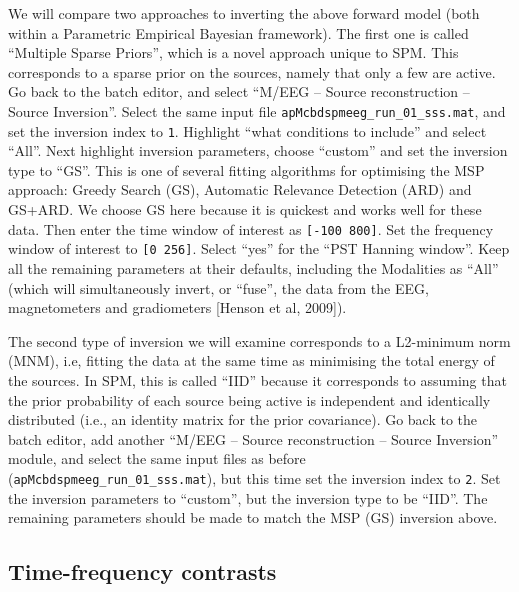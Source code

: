 We will compare two approaches to inverting the above forward model (both within a Parametric Empirical Bayesian framework). The first one is called ``Multiple Sparse Priors'', which is a novel approach unique to SPM. This corresponds to a sparse prior on the sources, namely that only a few are active. Go back to the batch editor, and select ``M/EEG -- Source reconstruction -- Source Inversion''. Select the same input file \texttt{apMcbdspmeeg\_run\_01\_sss.mat}, and set the inversion index to \texttt{1}. Highlight ``what conditions to include'' and select ``All''. Next highlight inversion parameters, choose ``custom'' and set the inversion type to ``GS''. This is one of several fitting algorithms for optimising the MSP approach: Greedy Search (GS), Automatic Relevance Detection (ARD) and GS+ARD. We choose GS here because it is quickest and works well for these data. Then enter the time window of interest as \texttt{[-100 800]}. Set the frequency window of interest to \texttt{[0 256]}. Select ``yes'' for the ``PST Hanning window''. Keep all the remaining parameters at their defaults, including the Modalities as ``All'' (which will simultaneously invert, or ``fuse'', the data from the EEG, magnetometers and gradiometers [Henson et al, 2009]).

The second type of inversion we will examine corresponds to a L2-minimum norm (MNM), i.e, fitting the data at the same time as minimising the total energy of the sources. In SPM, this is called ``IID'' because it corresponds to assuming that the prior probability of each source being active is independent and identically distributed (i.e., an identity matrix for the prior covariance). Go back to the batch editor, add another ``M/EEG -- Source reconstruction -- Source Inversion'' module, and select the same input files as before (\texttt{apMcbdspmeeg\_run\_01\_sss.mat}), but this time set the inversion index to \texttt{2}. Set the inversion parameters to ``custom'', but the inversion type to be ``IID''. The remaining parameters should be made to match the MSP (GS) inversion above.

\subsection{Time-frequency contrasts}

